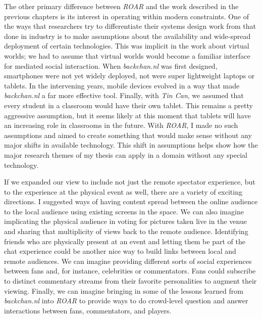 The other primary difference between \emph{ROAR} and the work described in the previous chapters is its interest in operating within modern constraints. One of the ways that researchers try to differentiate their systems design work from that done in industry is to make assumptions about the availability and wide-spread deployment of certain technologies. This was implicit in the work about virtual worlds; we had to assume that virtual worlds would become a familiar interface for mediated social interaction. When \emph{backchan.nl} was first designed, smartphones were not yet widely deployed, not were super lightweight laptops or tablets. In the intervening years, mobile devices evolved in a way that made \emph{backchan.nl} a far more effective tool. Finally, with \emph{Tin Can}, we assumed that every student in a classroom would have their own tablet. This remains a pretty aggressive assumption, but it seems likely at this moment that tablets will have an increasing role in classrooms in the future. With \emph{ROAR}, I made no such assumptions and aimed to create something that would make sense without any major shifts in available technology. This shift in assumptions helps show how the major research themes of my thesis can apply in a domain without any special technology.

If we expanded our view to include not just the remote spectator experience, but to the experience at the physical event as well, there are a variety of exciting directions. I suggested ways of having content spread between the online audience to the local audience using existing screens in the space. We can also imagine implicating the physical audience in voting for pictures taken live in the venue and sharing that multiplicity of views back to the remote audience. Identifying friends who are physically present at an event and letting them be part of the chat experience could be another nice way to build links between local and remote audiences. We can imagine providing different sorts of social experiences between fans and, for instance, celebrities or commentators. Fans could subscribe to distinct  commentary streams from their favorite personalities to augment their viewing. Finally, we can imagine bringing in some of the lessons learned from \emph{backchan.nl}  into \emph{ROAR} to provide ways to do crowd-level question and answer interactions between fans, commentators, and players. 






	
